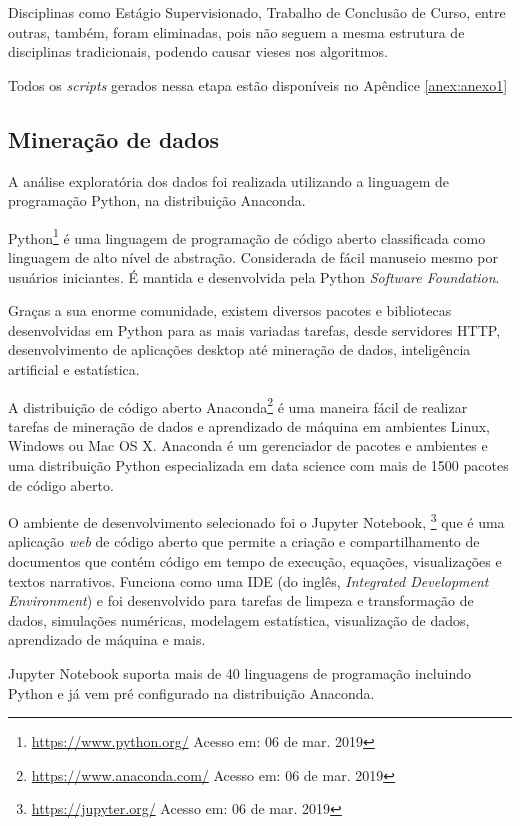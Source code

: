 Disciplinas como Estágio Supervisionado, Trabalho de Conclusão de Curso, entre
outras, também, foram eliminadas, pois não seguem a mesma estrutura de
disciplinas tradicionais, podendo causar vieses nos algoritmos.

Todos os \textit{scripts} gerados nessa etapa estão disponíveis no Apêndice
\ref{anex:anexo1}

\subsection{Mineração de dados}

A análise exploratória dos dados foi realizada utilizando a linguagem de
programação Python, na distribuição Anaconda.

Python\footnote{\url{https://www.python.org/} Acesso em: 06 de mar. 2019} é uma
linguagem de programação de código aberto classificada como linguagem de alto
nível de abstração. Considerada de fácil manuseio mesmo por usuários iniciantes.
É mantida e desenvolvida pela Python \textit{Software Foundation}.

Graças a sua enorme comunidade, existem diversos pacotes e bibliotecas
desenvolvidas em Python para as mais variadas tarefas, desde servidores HTTP,
desenvolvimento de aplicações desktop até mineração de dados, inteligência
artificial e estatística.

A distribuição de código aberto
Anaconda\footnote{\url{https://www.anaconda.com/} Acesso em: 06 de mar. 2019}  é
uma maneira fácil de realizar tarefas de mineração de dados e aprendizado de
máquina em ambientes Linux, Windows ou Mac OS X. Anaconda é um gerenciador de
pacotes e ambientes e uma distribuição Python especializada em data science com
mais de 1500 pacotes de código aberto.

O ambiente de desenvolvimento selecionado foi o Jupyter Notebook,
\footnote{\url{https://jupyter.org/} Acesso em: 06 de mar. 2019} que é uma
aplicação \textit{web} de código aberto que permite a criação e compartilhamento
de documentos que contém código em tempo de execução, equações, visualizações e
textos narrativos. Funciona como uma IDE (do inglês, \textit{Integrated
Development Environment}) e foi desenvolvido para tarefas de limpeza e
transformação de dados, simulações numéricas, modelagem estatística,
visualização de dados, aprendizado de máquina e mais.

Jupyter Notebook suporta mais de 40 linguagens de programação incluindo Python e
já vem pré configurado na distribuição Anaconda.

